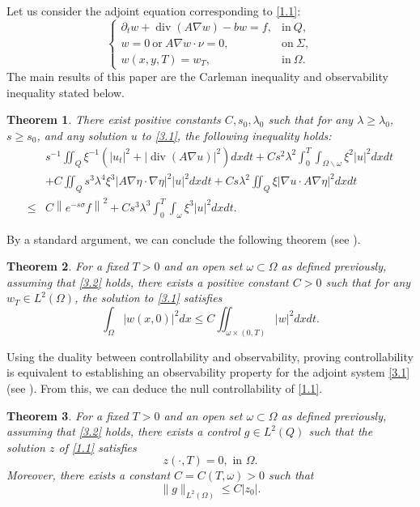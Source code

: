\documentclass[9pt,reqno]{amsart}
\newtheorem{theorem}{Theorem}
\theoremstyle{plain}
\numberwithin{equation}{section}
\numberwithin{theorem}{section}
\def\Om{\Omega}
\DeclareMathOperator*{\Div}{\mathrm{div}}
\def\Om{\Omega}
\begin{document}
	Let us consider the adjoint equation corresponding to \eqref{1.1}:
	\begin{equation}\label{3.1}
		\begin{cases}
			\partial_{t}w + \Div(A\nabla w) -bw=f, & \mbox{in} \ Q,  \\
			w=0 \ \mbox{or} \ A\nabla w \cdot \nu =0,  & \mbox{on} \ \Sigma,  \\
			w(x,  y,  T)= w_T,  & \mbox{in} \ \Omega.  
		\end{cases}
	\end{equation}
	The main results of this paper are the Carleman inequality and observability inequality stated below.
	\begin{theorem}\label{TH2}
		There exist positive constants $C, s_0, \lambda_0$ such that for any $\lambda \ge \lambda_0$, $s \ge s_0$, and any solution $u$ to \eqref{3.1}, the following inequality holds:
		\begin{equation}\label{3.2}
			\begin{split}
				&s^{-1}\iint_{Q} \xi^{-1} (|u_t |^2 + \left|\Div(A\nabla u)\right|^2) dx dt +C s^2 \lambda^2 \int_0^T \int_{\Om\backslash \omega} \xi^{2}|u|^2dx  d t\\
				&+C\iint_Q s^3 \lambda^4 \xi^3\left|A \nabla \eta \cdot \nabla \eta \right|^2|u|^2 dx dt  + C s  \lambda^2 \iint_Q\xi|\nabla u \cdot A \nabla \eta|^2 dx  d t\\
				\leq& C\left\|e^{-s \sigma} f\right\|^2
				+Cs^3 \lambda^3 \int_0^T \int_{\omega} \xi^3|u|^2dx  d t.
			\end{split}
		\end{equation}
	\end{theorem}
	By a standard argument, we can conclude the following theorem (see \cite{FE,ZZ2006}).
	\begin{theorem}\label{TH4}
		For a fixed $T>0$ and an open set $\omega \subset \Omega$ as defined previously, assuming that \eqref{3.2} holds, there exists a positive constant $C>0$ such that for any $w_T \in L^2(\Omega)$, the solution to \eqref{3.1} satisfies
		\begin{equation}\label{3.4}
			\int_{\Omega}|w(x, 0)|^2 d x \leq C \iint_{\omega \times(0, T)}|w|^2 d x d t.
		\end{equation}
	\end{theorem}
	Using the duality between controllability and observability, proving controllability is equivalent to establishing an observability property for the adjoint system \eqref{3.1} (see \cite{rockafellar1967duality,lions1992remarks}). From this, we can deduce the null controllability of \eqref{1.1}.
	\begin{theorem}\label{TH3}
		For a fixed $T>0$ and an open set $\omega \subset \Omega$ as defined previously, assuming that \eqref{3.2} holds, there exists a control $g \in L^2(Q)$ such that the solution $z$ of \eqref{1.1} satisfies
		$$
		z(\cdot, T)=0, \text { in } \Omega.
		$$
		Moreover, there exists a constant $C=C(T, \omega)>0$ such that
		$$
		\|g\|_{L^2(\Om)} \leq C\left|z_0\right| .
		$$
	\end{theorem}
\end{document}
